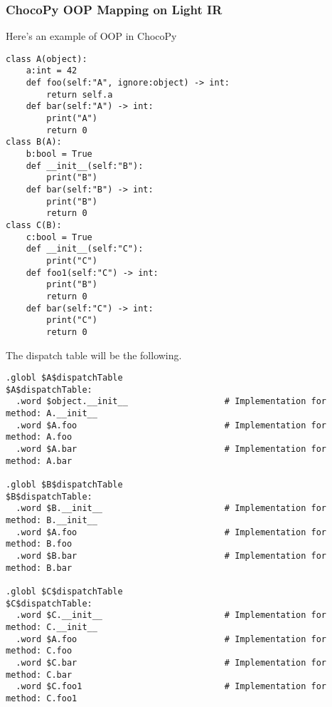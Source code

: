 \documentclass[a4paper]{exam}
\theoremstyle{definition}
\begin{document}
\subsubsection{ChocoPy OOP Mapping on Light IR}
Here's an example of OOP in ChocoPy
\begin{verbatim}
class A(object):
    a:int = 42
    def foo(self:"A", ignore:object) -> int:
        return self.a
    def bar(self:"A") -> int:
        print("A")
        return 0
class B(A):
    b:bool = True
    def __init__(self:"B"):
        print("B")
    def bar(self:"B") -> int:
        print("B")
        return 0
class C(B):
    c:bool = True
    def __init__(self:"C"):
        print("C")
    def foo1(self:"C") -> int:
        print("B")
        return 0
    def bar(self:"C") -> int:
        print("C")
        return 0
\end{verbatim}
The dispatch table will be the following.
\begin{verbatim}
.globl $A$dispatchTable
$A$dispatchTable:
  .word $object.__init__                   # Implementation for method: A.__init__
  .word $A.foo                             # Implementation for method: A.foo
  .word $A.bar                             # Implementation for method: A.bar

.globl $B$dispatchTable
$B$dispatchTable:
  .word $B.__init__                        # Implementation for method: B.__init__
  .word $A.foo                             # Implementation for method: B.foo
  .word $B.bar                             # Implementation for method: B.bar

.globl $C$dispatchTable
$C$dispatchTable:
  .word $C.__init__                        # Implementation for method: C.__init__
  .word $A.foo                             # Implementation for method: C.foo
  .word $C.bar                             # Implementation for method: C.bar
  .word $C.foo1                            # Implementation for method: C.foo1
\end{verbatim}
\end{document}
